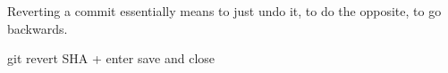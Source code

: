 Reverting a commit essentially means to just undo it, 
to do the opposite, to go backwards.

git revert SHA   + enter 
save and close 
